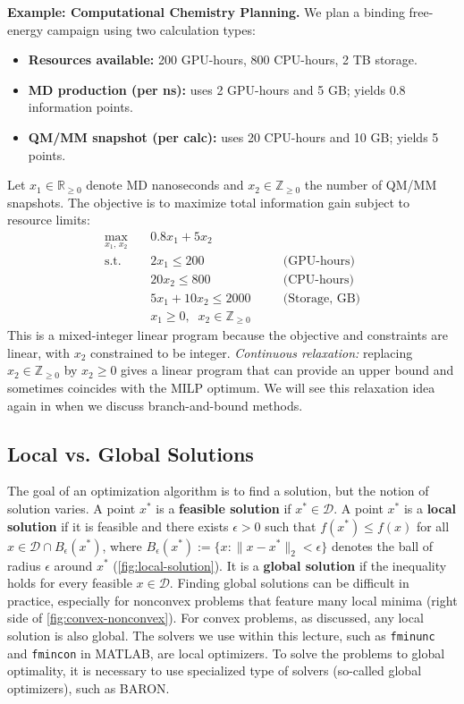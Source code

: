 \begin{exampleBox}
    \textbf{Example: Computational Chemistry Planning.}
    We plan a binding free-energy campaign using two calculation types:
    \begin{itemize}
      \item \textbf{Resources available:} 200 GPU-hours, 800 CPU-hours, 2 TB storage.
      \item \textbf{MD production (per ns):} uses 2 GPU-hours and 5 GB; yields 0.8 information points.
      \item \textbf{QM/MM snapshot (per calc):} uses 20 CPU-hours and 10 GB; yields 5 points.
    \end{itemize}
    Let $x_1 \in \mathbb{R}_{\ge 0}$ denote MD nanoseconds and $x_2 \in \mathbb{Z}_{\ge 0}$ the number of QM/MM snapshots. 
    The objective is to maximize total information gain subject to resource limits:
    \[
    \begin{aligned}
    \max_{x_1,\,x_2}\quad & 0.8x_1 + 5x_2\\[2pt]
    \text{s.t.}\quad 
      & 2x_1 \le 200 \quad &&\text{(GPU-hours)}\\
      & 20x_2 \le 800 \quad &&\text{(CPU-hours)}\\
      & 5x_1 + 10x_2 \le 2000 \quad &&\text{(Storage, GB)}\\
      & x_1 \ge 0,\;\; x_2 \in \mathbb{Z}_{\ge 0}
    \end{aligned}
    \]
    This is a mixed-integer linear program because the objective and constraints are linear, with $x_2$ constrained to be integer.
    \emph{Continuous relaxation:} replacing $x_2 \in \mathbb{Z}_{\ge 0}$ by $x_2 \ge 0$ gives a linear program that can provide an upper bound and sometimes coincides with the MILP optimum. We will see this relaxation idea again in  when we discuss branch-and-bound methods.
\end{exampleBox}


\subsection{Local vs. Global Solutions}
The goal of an optimization algorithm is to find a solution, but the notion of solution varies. A point $x^*$ is a \textbf{feasible solution} if $x^* \in \mathcal{D}$. A point $x^*$ is a \textbf{local solution} if it is feasible and there exists $\epsilon>0$ such that $f(x^*) \le f(x)$ for all $x \in \mathcal{D} \cap B_{\epsilon}(x^*)$, where $B_\epsilon(x^*) := \{x : \|x-x^*\|_2 < \epsilon\}$ denotes the ball of radius $\epsilon$ around $x^*$ (\autoref{fig:local-solution}). It is a \textbf{global solution} if the inequality holds for every feasible $x \in \mathcal{D}$. Finding global solutions can be difficult in practice, especially for nonconvex problems that feature many local minima (right side of \autoref{fig:convex-nonconvex}). For convex problems, as discussed, any local solution is also global. The solvers we use within this lecture, such as \texttt{fminunc} and \texttt{fmincon} in MATLAB, are local optimizers. To solve the problems to global optimality, it is necessary to use specialized type of solvers (so-called global optimizers), such as BARON.

